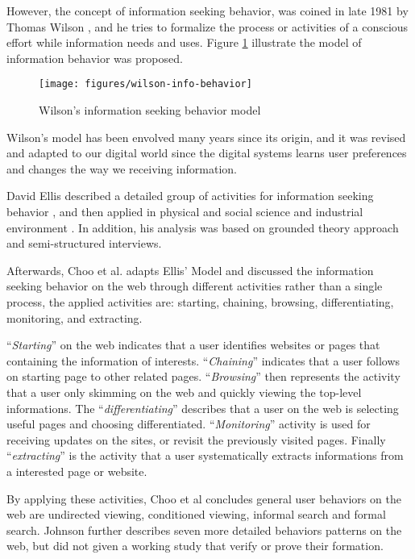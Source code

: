 However, the concept of information seeking behavior, was coined in late 1981 
by Thomas Wilson \cite{wilson1981user}, and he tries to formalize the process or 
activities of a conscious effort while information needs 
and uses. Figure \ref{fig:wilson-info-seek} illustrate the model of information behavior 
was proposed.

\begin{figure}[H]
    \centering
    \texttt{[image: figures/wilson-info-behavior]}
    \caption{Wilson's information seeking behavior model \cite{wilson1981user}}
    \label{fig:wilson-info-seek}
\end{figure}

Wilson's model has been envolved many years since its origin, and it was revised 
and adapted to our digital world since the digital systems learns user preferences and 
changes \cite{giannini1998receiving} the way we receiving information.

David Ellis described a detailed group of activities for information seeking behavior \cite{ellis1989behavioural},
and then applied in physical and social science \cite{ellis1993comparison} and industrial
environment \cite{ellis1997modelling}.
In addition, his analysis was
based on grounded theory approach \cite{aceto1994grounded} and semi-structured interviews. 

Afterwards, Choo et al. adapts Ellis' Model and discussed \cite{choo1999information}
the information seeking behavior on the web through different activities rather 
than a single process, the applied activities are:
starting, chaining, browsing, differentiating, monitoring, and extracting.

``\emph{Starting}'' on the web indicates that a user identifies websites or pages
that containing the information of interests.
``\emph{Chaining}'' indicates that a user follows on starting page to other related pages.
``\emph{Browsing}'' then represents the activity that a user only skimming on the web
and quickly viewing the top-level informations. The ``\emph{differentiating}'' 
describes that a user on the web is selecting useful pages and choosing differentiated.
``\emph{Monitoring}'' activity is used for receiving updates on the sites, or revisit
the previously visited pages. Finally ``\emph{extracting}'' is the activity that a user
systematically extracts informations from a interested page or website.

By applying these activities, Choo et al concludes general user behaviors on the web are
undirected viewing, conditioned viewing, informal search and formal search.
Johnson further describes \cite{johnson2017patterns} seven more detailed behaviors 
patterns on the web, but did not given a working study that verify or prove their formation.

